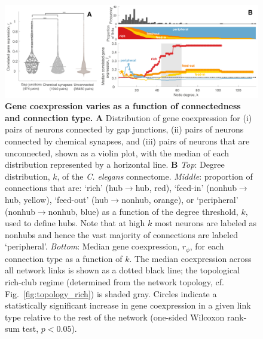 \documentclass[10pt,letterpaper]{article}
\begin{document}
 \begin{figure}[h]
 \centering
    \includegraphics[width=1\textwidth]{MeanCoexpression4.pdf}
\caption{{\bf Gene coexpression varies as a function of connectedness and connection type.}
\textbf{A} Distribution of gene coexpression for (i) pairs of neurons connected by gap junctions, (ii) pairs of neurons connected by chemical synapses, and (iii) pairs of neurons that are unconnected, shown as a violin plot, with the median of each distribution represented by a horizontal line.
\textbf{B}
\emph{Top}: Degree distribution, $k$, of the \emph{C. elegans} connectome.
\emph{Middle}: proportion of connections that are:
`rich' (hub$\rightarrow$hub, red),
`feed-in' (nonhub$\rightarrow$hub, yellow),
`feed-out' (hub$\rightarrow$nonhub, orange), or
`peripheral' (nonhub$\rightarrow$nonhub, blue) as a function of the degree threshold, $k$, used to define hubs.
Note that at high $k$ most neurons are labeled as nonhubs and hence the vast majority of connections are labeled `peripheral'.
 \emph{Bottom}: Median gene coexpression, $r_\phi$, for each connection type as a function of $k$.
 The median coexpression across all network links is shown as a dotted black line; the topological rich-club regime (determined from the network topology, cf. Fig.~\ref{fig:topology_rich}) is shaded gray.
Circles indicate a statistically significant increase in gene coexpression in a given link type relative to the rest of the network (one-sided Wilcoxon rank-sum test, $p < 0.05$).
}
 \label{fig:coExp}
\end{figure}
\end{document}
